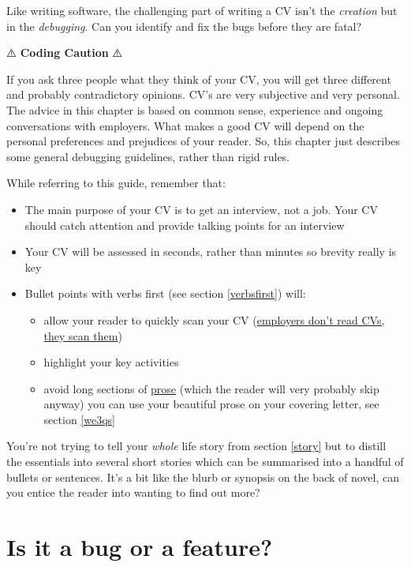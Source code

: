 \documentclass[
]{book}
\providecommand{\tightlist}{%
  \setlength{\itemsep}{0pt}\setlength{\parskip}{0pt}}
\begin{document}
Like writing software, the challenging part of writing a CV isn't the \emph{creation} but in the \emph{debugging}. Can you identify and fix the bugs before they are fatal?

⚠️ \textbf{Coding Caution} ⚠️

If you ask three people what they think of your CV, you will get three different and probably contradictory opinions. CV's are very subjective and very personal. The advice in this chapter is based on common sense, experience and ongoing conversations with employers. What makes a good CV will depend on the personal preferences and prejudices of your reader. So, this chapter just describes some general debugging guidelines, rather than rigid rules.

While referring to this guide, remember that:

\begin{itemize}
\tightlist
\item
  The main purpose of your CV is to get an interview, not a job. Your CV should catch attention and provide talking points for an interview
\item
  Your CV will be assessed in seconds, rather than minutes so brevity really is key
\item
  Bullet points with verbs first (see section \ref{verbsfirst}) will:

  \begin{itemize}
  \tightlist
  \item
    allow your reader to quickly scan your CV (\href{https://readabilityguidelines.co.uk/content-design/how-people-read/}{employers don't read CVs, they scan them}) \citep{scanning}
  \item
    highlight your key activities
  \item
    avoid long sections of \href{https://en.wikipedia.org/wiki/Prose}{prose} (which the reader will very probably skip anyway) you can use your beautiful prose on your covering letter, see section \ref{we3qs}
  \end{itemize}
\end{itemize}

You're not trying to tell your \emph{whole} life story from section \ref{story} but to distill the essentials into several short stories which can be summarised into a handful of bullets or sentences. It's a bit like the blurb or synopsis on the back of novel, can you entice the reader into wanting to find out more?

\hypertarget{mycv}{%
\section{Is it a bug or a feature?}\label{mycv}}
\end{document}
